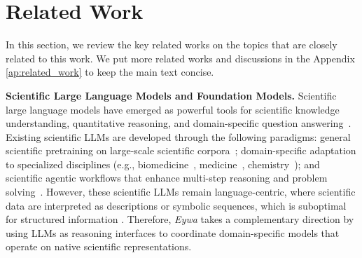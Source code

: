 \section{Related Work}

In this section, we review the key related works on the topics that are closely related to this work. We put more related works and discussions in the Appendix \ref{ap:related_work} to keep the main text concise.

\textbf{Scientific Large Language Models and Foundation Models.} 
Scientific large language models have emerged as powerful tools for scientific knowledge understanding, quantitative reasoning, and domain-specific question answering~\citep{hu2025survey, zhang2024comprehensive}. 
Existing scientific LLMs are developed through the following paradigms: general scientific pretraining on large-scale scientific corpora~\citep{taylor2022galactica,lewkowycz2022solving}; domain-specific adaptation to specialized disciplines (e.g., biomedicine~\citep{luo2022biogpt}, medicine~\citep{singhal2023large}, chemistry~\citep{zhang2024chemllm,yu2024llasmol}); and scientific agentic workflows that enhance multi-step reasoning and problem solving~\citep{zhang2024sciglm, boiko2023autonomous, ghafarollahi2025sciagents}. 
However, these scientific LLMs remain language-centric, where scientific data are interpreted as descriptions or symbolic sequences, which is suboptimal for structured information \cite{jin2023time, sui2024table, sadeghi2024can}.
Therefore, \textit{Eywa} takes a complementary direction by using LLMs as reasoning interfaces to coordinate domain-specific models that operate on native scientific representations.


